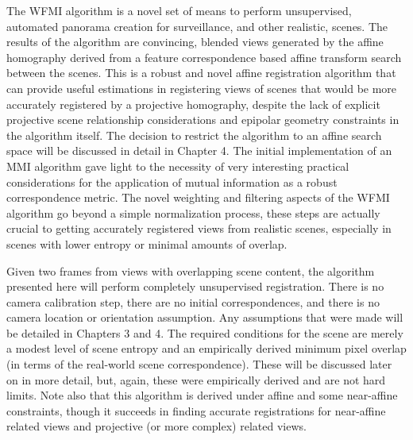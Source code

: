 %
%
%
%
%
%
%
%
%

%
%
%



The WFMI algorithm is a novel set of means to perform unsupervised, automated panorama creation for surveillance, and other realistic, scenes. The results of the algorithm are convincing, blended views generated by the affine homography derived from a feature correspondence based affine transform search between the scenes. This is a robust and novel affine registration algorithm that can provide useful estimations in registering views of scenes that would be more accurately registered by a projective homography, despite the lack of explicit projective scene relationship considerations and epipolar geometry constraints in the algorithm itself. The decision to restrict the algorithm to an affine search space will be discussed in detail in Chapter 4. The initial implementation of an MMI algorithm gave light to the necessity of very interesting practical considerations for the application of mutual information as a robust correspondence metric. The novel weighting and filtering aspects of the WFMI algorithm go beyond a simple normalization process, these steps are actually crucial to getting accurately registered views from realistic scenes, especially in scenes with lower entropy or minimal amounts of overlap.

Given two frames from views with overlapping scene content, the algorithm presented here will perform completely unsupervised registration. There is no camera calibration step, there are no initial correspondences, and there is no camera location or orientation assumption. Any assumptions that were made will be detailed in Chapters 3 and 4. The required conditions for the scene are merely a modest level of scene entropy and an empirically derived minimum pixel overlap (in terms of the real-world scene correspondence). These will be discussed later on in more detail, but, again, these were empirically derived and are not hard limits. Note also that this algorithm is derived under affine and some near-affine constraints, though it succeeds in finding accurate registrations for near-affine related views and projective (or more complex) related views.


